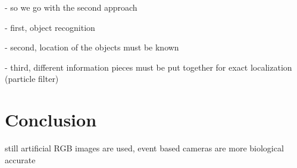 	- so we go with the second approach

	- first, object recognition
	
	- second, location of the objects must be known
	
	- third, different information pieces must be put together for exact localization (particle filter) \citep{siagian2009biologically}


\chapter{Conclusion}

	still artificial RGB images are used, event based cameras are more biological accurate
	
